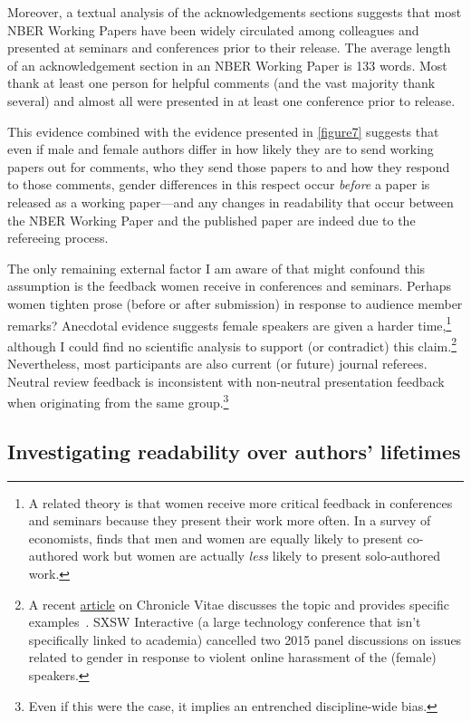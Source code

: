 Moreover, a textual analysis of the acknowledgements sections suggests that most NBER Working Papers have been widely circulated among colleagues and presented at seminars and conferences prior to their release. The average length of an acknowledgement section in an NBER Working Paper is 133 words. Most thank at least one person for helpful comments (and the vast majority thank several) and almost all were presented in at least one conference prior to release.

This evidence combined with the evidence presented in \autoref{figure7} suggests that even if male and female authors differ in how likely they are to send working papers out for comments, who they send those papers to and how they respond to those comments, gender differences in this respect occur \emph{before} a paper is released as a working paper---and any changes in readability that occur between the NBER Working Paper and the published paper are indeed due to the refereeing process.

The only remaining external factor I am aware of that might confound this assumption is the feedback women receive in conferences and seminars. Perhaps women tighten prose (before or after submission) in response to audience member remarks? Anecdotal evidence suggests female speakers are given a harder time,\footnote{A related theory is that women receive more critical feedback in conferences and seminars because they present their work more often. In a survey of economists,  \citet{Sarsons2015} finds that men and women are equally likely to present co-authored work but women are actually \emph{less} likely to present solo-authored work.} although I could find no scientific analysis to support (or contradict) this claim.\footnote{A recent \href{https://chroniclevitae.com/news/1182-should-academic-conferences-have-codes-of-conduct}{article} on Chronicle Vitae discusses the topic and provides specific examples~\citep{Baker2015}. SXSW Interactive (a large technology conference that isn't specifically linked to academia) cancelled two 2015 panel discussions on issues related to gender in response to violent online harassment of the (female) speakers.} Nevertheless, most participants are also current (or future) journal referees. Neutral review feedback is inconsistent with non-neutral presentation feedback when originating from the same group.\footnote{Even if this were the case, it implies an entrenched discipline-wide bias.} 

\subsection{Investigating readability over authors' lifetimes}
\label{experience}

